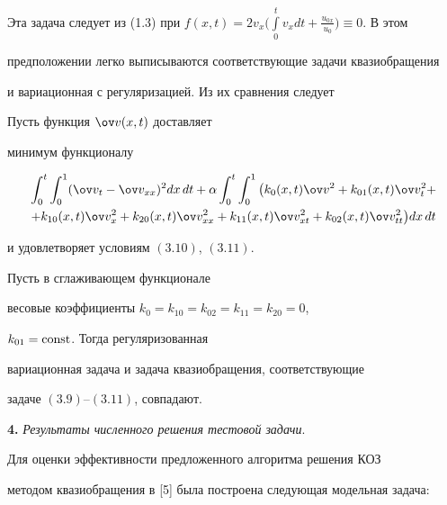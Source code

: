 Эта задача следует из (1.3) при $f(x,t)=2v_x\Big(\int\limits^t_0 v_x 


dt+\frac{u_{0x}}{u_0}\Big)\equiv0$. В этом 


предположении легко выписываются соответствующие задачи квазиобращения 


и вариационная с регуляризацией. Из их сравнения следует 


 


\begin{thm} 


Пусть функция $\ov v(x,t)$ доставляет 


минимум функционалу 


\begin{multline*} 


\int^t_0\int^1_0(\ov v_t-\ov v_{xx})^2dx\,dt+\alpha 


\int^t_0\int^1_0\big(k_0(x,t)\ov v^2+ 


k_{01}(x,t)\ov v^2_t + \\ 


% 


+k_{10}(x,t)\ov v^2_x+k_{20}(x,t)\ov v^2_{xx}+ 


k_{11}(x,t)\ov v^2_{xt}+k_{02}(x,t)\ov v^2_{tt}\big)dx\,dt 


\end{multline*} 


и удовлетворяет условиям $(3.10)$, $(3.11)$. 


Пусть в сглаживающем функционале 


весовые коэффициенты $k_0=k_{10}=k_{02}=k_{11}=k_{20}=0$, 


$k_{01}=\operatorname{const}$. Тогда регуляризованная 


вариационная задача и задача квазиобращения, соответствующие 


задаче $(3.9)$--$(3.11)$, совпадают. 


\end{thm} 


 


 


{\bf 4.} {\it Результаты численного решения тестовой задачи}. 


Для оценки эффективности предложенного алгоритма решения КОЗ 


методом квазиобращения в [5] была построена следующая модельная задача: 


